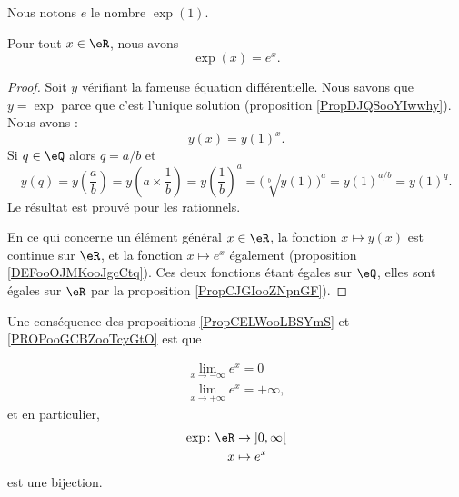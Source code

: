 \begin{definition}
	Nous notons \( e\) le nombre \( \exp(1)\).
\end{definition}

\begin{proposition}     \label{PropCELWooLBSYmS}
	Pour tout \( x\in \eR\), nous avons
	\begin{equation}        \label{EQooBFIHooKopcmf}
		\exp(x)=e^x.
	\end{equation}
\end{proposition}

\begin{proof}
	Soit \( y\) vérifiant la fameuse équation différentielle. Nous savons que \( y=\exp\) parce que c'est l'unique solution (proposition \ref{PropDJQSooYIwwhy}). Nous avons :
	\begin{equation}
		y(x)=y(1)^x.
	\end{equation}
	Si \( q\in \eQ\) alors \( q=a/b\) et
	\begin{equation}
		y(q)=y\left( \frac{ a }{ b } \right)=y\left( a\times \frac{1}{ b } \right)=y\left( \frac{1}{ b } \right)^a=\big( \sqrt[b]{y(1)} \big)^a=y(1)^{a/b}=y(1)^{q}.
	\end{equation}
	Le résultat est prouvé pour les rationnels.

	En ce qui concerne un élément général \( x\in \eR\), la fonction \( x\mapsto y(x)\) est continue sur \( \eR\), et la fonction \( x\mapsto e^x\) également (proposition \ref{DEFooOJMKooJgcCtq}). Ces deux fonctions étant égales sur \( \eQ\), elles sont égales sur \( \eR\) par la proposition  \ref{PropCJGIooZNpnGF}).
\end{proof}

Une conséquence des propositions \ref{PropCELWooLBSYmS} et \ref{PROPooGCBZooTcyGtO} est que

\begin{subequations}    \label{EqLOIUooHxnEDn}
	\begin{align}
		\lim_{x\to -\infty}  e^{x}=0 \\
		\lim_{x\to +\infty}  e^{x}=+\infty,
	\end{align}
\end{subequations}
et en particulier,
\begin{equation}
	\begin{aligned}
		\exp\colon \eR & \to \mathopen] 0 , \infty \mathclose[ \\
		x              & \mapsto  e^{x}
	\end{aligned}
\end{equation}
est une bijection.

